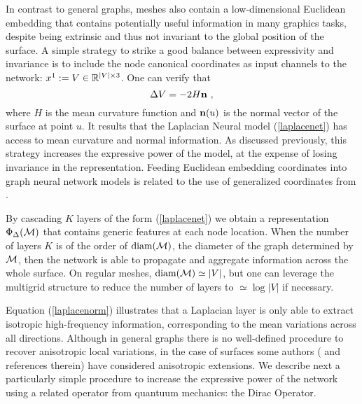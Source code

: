 In contrast to general graphs, meshes also contain a low-dimensional Euclidean embedding that 
contains potentially useful information in many graphics tasks, despite being extrinsic and thus 
not invariant to the global position of the surface. A simple strategy to strike a good balance between 
expressivity and invariance is to include the node canonical coordinates as input channels to the network: $x^{1}:=V \in {\mathbb{R}}^{|V| \times 3}$. 
One can verify \cite{geom} that 
\begin{equation}
\label{laplacenorm}
\Delta V = -2 H \bf{n}~,
\end{equation}
where $H$ is the mean curvature function and ${\bf n}(u)$ is the normal vector of the surface at point $u$.
It results that the Laplacian Neural model (\ref{laplacenet}) has access to mean curvature and normal information.
As discussed previously, this strategy increases the expressive power of the model, at the expense of losing 
invariance in the representation. %
Feeding Euclidean embedding coordinates into graph neural network models is related to the use of generalized coordinates from \cite{monet}.

By cascading $K$ layers of the form (\ref{laplacenet}) we obtain a representation $\Phi_{\Delta}({\mathcal{M}})$ 
that contains generic features at each node location. When the number of layers $K$ is of the order of 
$\text{diam}({\mathcal{M}})$, the diameter of the graph determined by ${\mathcal{M}}$, then the network is able to propagate and aggregate
information across the whole surface. On regular meshes, $\text{diam}({\mathcal{M}}) \simeq |V|$, but one can leverage 
the multigrid structure to reduce the number of layers to $\simeq \log |V|$  \cite{gnnreview} if necessary.

Equation (\ref{laplacenorm}) illustrates that a Laplacian layer is only able to extract isotropic high-frequency information, 
corresponding to the mean variations across all directions. Although in general graphs there is no well-defined procedure 
to recover anisotropic local variations, in the case of surfaces some authors (\cite{bronstein1} and references therein) have 
considered anisotropic extensions. We describe next a particularly simple procedure to increase 
the expressive power of the network using a related operator from quantuum mechanics: the Dirac Operator.
 
